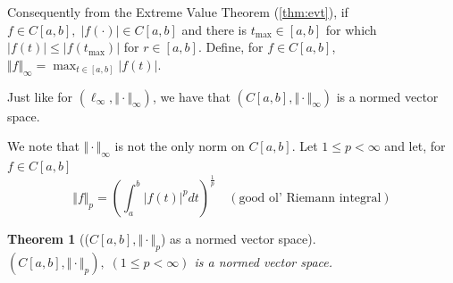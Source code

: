 \documentclass[11pt, oneside]{book}
\theoremstyle{break}
\newtheorem{thm}{Theorem}[section]
\begin{document}
Consequently from the Extreme Value Theorem (\autoref{thm:evt}), if $f \in C[a, b], \; |f(\cdot)| \in C[a, b]$ and there is $t_{\max} \in [a, b]$ for which $|f(t)| \leq |f(t_{\max})|$ for $r \in [a, b]$. Define, for $f \in C[a,b]$, $\Vert f\Vert _\infty = \max_{t \in [a,b]} |f(t)|$.

Just like for $(\ell_\infty, \Vert \cdot\Vert _\infty)$, we have that $(C[a,b], \Vert \cdot\Vert _\infty)$ is a normed vector space.

We note that $\Vert \cdot\Vert _\infty$ is not the only norm on $C[a,b]$. Let $1 \leq p < \infty$ and let, for $f \in C[a, b]$
\begin{equation}
	\Vert f\Vert _p = \left( \int_{a}^{b} |f(t)|^p dt \right)^{\frac{1}{p}} \quad (\text{good ol' Riemann integral})
\end{equation}

\begin{thm}[(\texorpdfstring{$C[a, b], \Vert \cdot\Vert _p$}{}) as a normed vector space]
	$(C[a,b], \Vert \cdot\Vert _p), \; (1 \leq p < \infty)$ is a normed vector space.
\end{thm}
\end{document}
